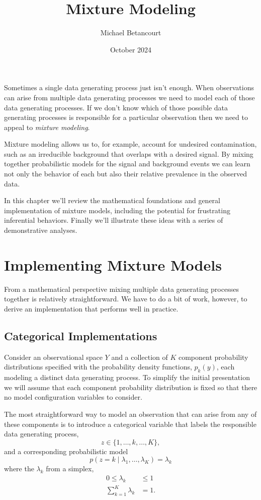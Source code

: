 \documentclass[
  letterpaper,
  DIV=11,
  numbers=noendperiod]{scrartcl}
\title{Mixture Modeling}
\author{Michael Betancourt}
\date{October 2024}
\renewcommand*\contentsname{Table of contents}
\newcommand\contentsname{Table of contents}
\begin{document}
\maketitle

\renewcommand*\contentsname{Table of contents}
{
\hypersetup{linkcolor=}
\setcounter{tocdepth}{3}
\tableofcontents
}
Sometimes a single data generating process just isn't enough. When
observations can arise from multiple data generating processes we need
to model each of those data generating processes. If we don't know which
of those possible data generating processes is responsible for a
particular observation then we need to appeal to \emph{mixture
modeling}.

Mixture modeling allows us to, for example, account for undesired
contamination, such as an irreducible background that overlaps with a
desired signal. By mixing together probabilistic models for the signal
and background events we can learn not only the behavior of each but
also their relative prevalence in the observed data.

In this chapter we'll review the mathematical foundations and general
implementation of mixture models, including the potential for
frustrating inferential behaviors. Finally we'll illustrate these ideas
with a series of demonstrative analyses.

\section{Implementing Mixture Models}\label{implementing-mixture-models}

From a mathematical perspective mixing multiple data generating
processes together is relatively straightforward. We have to do a bit of
work, however, to derive an implementation that performs well in
practice.

\subsection{Categorical Implementations}\label{sec:cat_impl}

Consider an observational space \(Y\) and a collection of \(K\)
component probability distributions specified with the probability
density functions, \(p_{k}(y)\), each modeling a distinct data
generating process. To simplify the initial presentation we will assume
that each component probability distribution is fixed so that there no
model configuration variables to consider.

The most straightforward way to model an observation that can arise from
any of these components is to introduce a categorical variable that
labels the responsible data generating process, \[
z \in \{ 1, \ldots, k, \ldots, K \},
\] and a corresponding probabilistic model \[
p(z = k \mid \lambda_{1}, \ldots, \lambda_{K}) = \lambda_{k}
\] where the \(\lambda_{k}\) from a simplex, \begin{align*}
0 \le \lambda_{k} &\le 1
\\
\sum_{k = 1}^{K} \lambda_{k} &= 1.
\end{align*}
\end{document}
